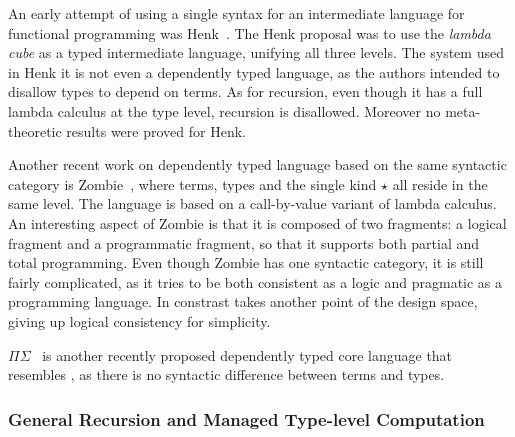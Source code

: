 An early attempt of using a single syntax for an intermediate language
for functional programming was Henk~\cite{pts:henk}. The Henk proposal
was to use the \emph{lambda cube} as a typed intermediate language,
unifying all three levels. The system used in Henk
it is not even a dependently typed
language, as the authors intended to  disallow types to depend
on terms. As for recursion, even though it has a full lambda calculus
at the type level, recursion is disallowed. Moreover no meta-theoretic 
results were proved for Henk.

\begin{comment}
Since the implicit conversion of the lambda
cube is not syntax-directed, they come up with a approach to
strategically distribute the conversion rule over the other typing
rules. In retrospect, Henk is quite conservative in terms of
type-level computation. Actually it is not even a dependently typed
language, as they clearly state that they don't allow types to depend
on terms. As for recursion, even though it has a full lambda calculus
at the type level, recursion is disallowed. In Henk the authors have
not attempted to prove any meta-theoretic results.
\end{comment}

Another recent work on dependently typed language based on the same
syntactic category is \textsf{Zombie}~\cite{zombie:popl14,
  zombie:thesis}, where terms, types and the single kind $\star$ all
reside in the same level. The language is based on a call-by-value
variant of lambda calculus. An interesting aspect of Zombie is that
it is composed of two fragments: a logical fragment and a programmatic
fragment, so that it supports both partial and total programming. Even
though Zombie has one syntactic category, it is still fairly
complicated, as it tries to be both consistent as a logic and
pragmatic as a programming language. In constrast \name takes 
another point of the design space, giving up logical consistency 
for simplicity.

$\Pi\Sigma$~\cite{dep:pisigma} is another recently proposed
dependently typed core language that resembles \name, as there is no
syntactic difference between terms and types.

\subsubsection{General Recursion and Managed Type-level Computation}

